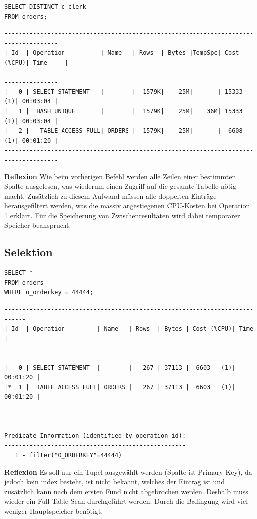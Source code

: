 \documentclass[10pt]{article}
\begin{document}
\begin{lstlisting}[style=sql]
SELECT DISTINCT o_clerk
FROM orders;
\end{lstlisting}
\begin{lstlisting}[style=queryexecutionplan]
-------------------------------------------------------------------------------------
| Id  | Operation          | Name   | Rows  | Bytes |TempSpc| Cost (%CPU)| Time     |
-------------------------------------------------------------------------------------
|   0 | SELECT STATEMENT   |        |  1579K|    25M|       | 15333   (1)| 00:03:04 |
|   1 |  HASH UNIQUE       |        |  1579K|    25M|    36M| 15333   (1)| 00:03:04 |
|   2 |   TABLE ACCESS FULL| ORDERS |  1579K|    25M|       |  6608   (1)| 00:01:20 |
-------------------------------------------------------------------------------------
\end{lstlisting} 
\textbf{Reflexion} \newline
Wie beim vorherigen Befehl werden alle Zeilen einer bestimmten Spalte ausgelesen,
was wiederum einen Zugriff auf die gesamte Tabelle nötig macht.
Zusätzlich zu diesem Aufwand müssen alle doppelten Einträge herausgefiltert werden,
was die massiv angestiegenen CPU-Kosten bei Operation 1 erklärt.
Für die Speicherung von Zwischenresultaten wird dabei temporärer Speicher beansprucht.

\subsection{Selektion}
\begin{lstlisting}[style=sql]
SELECT *
FROM orders
WHERE o_orderkey = 44444;
\end{lstlisting}
\begin{lstlisting}[style=queryexecutionplan]
----------------------------------------------------------------------------
| Id  | Operation         | Name   | Rows  | Bytes | Cost (%CPU)| Time     |
----------------------------------------------------------------------------
|   0 | SELECT STATEMENT  |        |   267 | 37113 |  6603   (1)| 00:01:20 |
|*  1 |  TABLE ACCESS FULL| ORDERS |   267 | 37113 |  6603   (1)| 00:01:20 |
----------------------------------------------------------------------------

Predicate Information (identified by operation id):
---------------------------------------------------
   1 - filter("O_ORDERKEY"=44444)
\end{lstlisting}
\textbf{Reflexion} \newline
Es soll nur ein Tupel ausgewählt werden (Spalte ist Primary Key), da jedoch 
kein index besteht, ist nicht bekannt, welches der Eintrag ist und zusätzlich 
kann nach dem ersten Fund nicht abgebrochen werden. Deshalb muss wieder ein 
Full Table Scan durchgeführt werden. Durch die Bedingung wird viel weniger 
Hauptspeicher benötigt.
\end{document}
